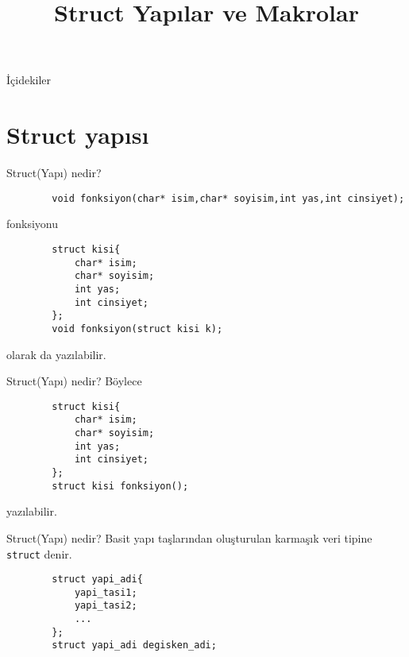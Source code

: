 
\title[Ders 6] {Struct Yapılar ve Makrolar}

\frame{\titlepage}
\begin{frame}[fragile]{İçidekiler}
    \tableofcontents
\end{frame}
\section{Struct yapısı}
\begin{frame}[fragile]{Struct(Yapı) nedir?}
    \begin{lstlisting}
        void fonksiyon(char* isim,char* soyisim,int yas,int cinsiyet);
    \end{lstlisting}
    fonksiyonu
    \begin{lstlisting}
        struct kisi{
            char* isim;
            char* soyisim;
            int yas;
            int cinsiyet;
        };
        void fonksiyon(struct kisi k);\end{lstlisting}
    olarak da yazılabilir.
\end{frame}
\begin{frame}[fragile]{Struct(Yapı) nedir?}
    Böylece
    \begin{lstlisting}
        struct kisi{
            char* isim;
            char* soyisim;
            int yas;
            int cinsiyet;
        };
        struct kisi fonksiyon();\end{lstlisting}
    yazılabilir.
\end{frame}
\begin{frame}[fragile]{Struct(Yapı) nedir?}
    Basit yapı taşlarından oluşturulan karmaşık veri tipine \lstinline{struct} denir.
    \begin{lstlisting}
        struct yapi_adi{
            yapi_tasi1;
            yapi_tasi2;
            ...
        };
        struct yapi_adi degisken_adi;\end{lstlisting}
\end{frame}
